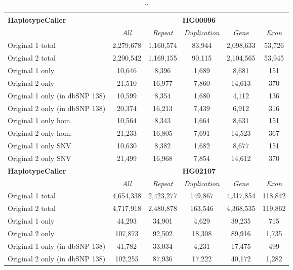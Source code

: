 \begin{table}[htb]
\caption{ .. }
\begin{center}
\begin{tabular}{|l|c||c|c|c|c|}
\hline
{\bf HaplotypeCaller} & \multicolumn{5}{|c|}{\bf HG00096} \\
\hline
\cline{2-6}
{\bf} & {\it All} & {\it Repeat} & {\it Duplication} & {\it Gene} & {\it Exon} \\
\hline
Original 1 total & 2,279,678 & 1,160,574 & 83,944 & 2,098,633 & 53,726 \\
\hline
Original 2 total & 2,290,542 & 1,169,155 & 90,115 & 2,104,565 & 53,945 \\
\hline
Original 1 only & 10,646    & 8,396     & 1,689  & 8,681     & 151    \\
\hline
Original 2 only & 21,510    & 16,977    & 7,860  & 14,613    & 370    \\
\hline
Original 1 only (in dbSNP 138) & 10,599    & 8,354     & 1,680  & 4,112     & 136    \\
\hline
Original 2 only (in dbSNP 138) & 20,374    & 16,213    & 7,439  & 6,912     & 316    \\
\hline
Original 1 only hom. & 10,564    & 8,343     & 1,664  & 8,631     & 151    \\
\hline
Original 2 only hom. & 21,233    & 16,805    & 7,691  & 14,523    & 367    \\
\hline
Original 1 only SNV & 10,630    & 8,382     & 1,682  & 8,677     & 151    \\
\hline
Original 2 only SNV & 21,499    & 16,968    & 7,854  & 14,612    & 370    \\
\hline
\hline
{\bf HaplotypeCaller} & \multicolumn{5}{|c|}{\bf HG02107} \\
\hline
\cline{2-6}
{\bf} & {\it All} & {\it Repeat} & {\it Duplication} & {\it Gene} & {\it Exon} \\
\hline
Original 1 total & 4,654,338 & 2,423,277 & 149,867 & 4,317,854 & 118,842 \\
\hline
Original 2 total & 4,717,918 & 2,480,878 & 163,546 & 4,368,535 & 119,862 \\
\hline
Original 1 only & 44,293    & 34,901    & 4,629   & 39,235    & 715     \\
\hline
Original 2 only & 107,873   & 92,502    & 18,308  & 89,916    & 1,735   \\
\hline
Original 1 only (in dbSNP 138) & 41,782    & 33,034    & 4,231   & 17,475    & 499     \\
\hline
Original 2 only (in dbSNP 138) & 102,255   & 87,936    & 17,222  & 40,172    & 1,282   \\

\end{tabular}
\end{center}
\end{table}
